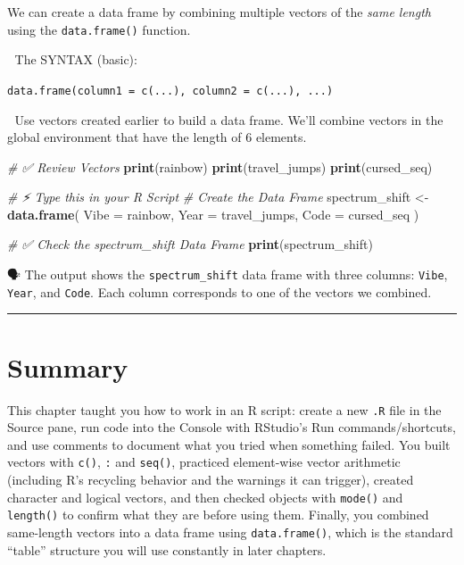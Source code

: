 \documentclass[
  12pt,
]{scrreprt}
\newenvironment{Shaded}{\begin{snugshade}}{\end{snugshade}}
\newcommand{\AttributeTok}[1]{\textcolor[rgb]{0.13,0.29,0.53}{#1}}
\newcommand{\CommentTok}[1]{\textcolor[rgb]{0.56,0.35,0.01}{\textit{#1}}}
\newcommand{\FunctionTok}[1]{\textcolor[rgb]{0.13,0.29,0.53}{\textbf{#1}}}
\newcommand{\NormalTok}[1]{#1}
\newcommand{\OtherTok}[1]{\textcolor[rgb]{0.56,0.35,0.01}{#1}}
\begin{document}
We can create a data frame by combining multiple vectors of the
\emph{same length} using the \texttt{data.frame()} function.

📜 The SYNTAX (basic):

\texttt{data.frame(column1\ =\ c(...),\ column2\ =\ c(...),\ ...)}

🎯 Use vectors created earlier to build a data frame. We'll combine
vectors in the global environment that have the length of 6 elements.

\begin{Shaded}
\begin{Highlighting}[]
\CommentTok{\# ✅  Review Vectors }
\FunctionTok{print}\NormalTok{(rainbow)}
\FunctionTok{print}\NormalTok{(travel\_jumps)}
\FunctionTok{print}\NormalTok{(cursed\_seq)}
\end{Highlighting}
\end{Shaded}

\begin{Shaded}
\begin{Highlighting}[]
\CommentTok{\# ⚡ Type this in your R Script}
\CommentTok{\# Create the Data Frame}
\NormalTok{spectrum\_shift }\OtherTok{\textless{}{-}} \FunctionTok{data.frame}\NormalTok{(}
  \AttributeTok{Vibe =}\NormalTok{ rainbow,}
  \AttributeTok{Year =}\NormalTok{ travel\_jumps,}
  \AttributeTok{Code =}\NormalTok{ cursed\_seq}
\NormalTok{)}
\end{Highlighting}
\end{Shaded}

\begin{Shaded}
\begin{Highlighting}[]
\CommentTok{\# ✅ Check the spectrum\_shift Data Frame}
\FunctionTok{print}\NormalTok{(spectrum\_shift)}
\end{Highlighting}
\end{Shaded}

🗣 The output shows the \texttt{spectrum\_shift} data frame with three
columns: \texttt{Vibe}, \texttt{Year}, and \texttt{Code}. Each column
corresponds to one of the vectors we combined.

\begin{center}\rule{0.5\linewidth}{0.5pt}\end{center}

\chapter{Summary}\label{summary}

This chapter taught you how to work in an R script: create a new
\texttt{.R} file in the Source pane, run code into the Console with
RStudio's Run commands/shortcuts, and use comments to document what you
tried when something failed. You built vectors with \texttt{c()},
\texttt{:} and \texttt{seq()}, practiced element-wise vector arithmetic
(including R's recycling behavior and the warnings it can trigger),
created character and logical vectors, and then checked objects with
\texttt{mode()} and \texttt{length()} to confirm what they are before
using them. Finally, you combined same-length vectors into a data frame
using \texttt{data.frame()}, which is the standard ``table'' structure
you will use constantly in later chapters.
\end{document}
